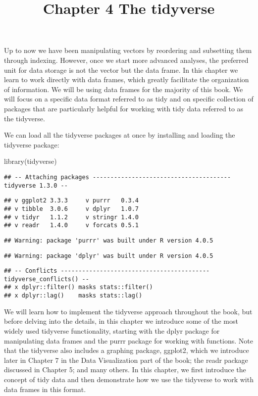 \documentclass[
]{article}
\title{Chapter 4 The tidyverse}
\author{}
\date{\vspace{-2.5em}}
\newenvironment{Shaded}{\begin{snugshade}}{\end{snugshade}}
\newcommand{\FunctionTok}[1]{\textcolor[rgb]{0.00,0.00,0.00}{#1}}
\newcommand{\NormalTok}[1]{#1}
\begin{document}
\maketitle

Up to now we have been manipulating vectors by reordering and subsetting
them through indexing. However, once we start more advanced analyses,
the preferred unit for data storage is not the vector but the data
frame. In this chapter we learn to work directly with data frames, which
greatly facilitate the organization of information. We will be using
data frames for the majority of this book. We will focus on a specific
data format referred to as tidy and on specific collection of packages
that are particularly helpful for working with tidy data referred to as
the tidyverse.

We can load all the tidyverse packages at once by installing and loading
the tidyverse package:

\begin{Shaded}
\begin{Highlighting}[]
\FunctionTok{library}\NormalTok{(tidyverse)}
\end{Highlighting}
\end{Shaded}

\begin{verbatim}
## -- Attaching packages --------------------------------------- tidyverse 1.3.0 --
\end{verbatim}

\begin{verbatim}
## v ggplot2 3.3.3     v purrr   0.3.4
## v tibble  3.0.6     v dplyr   1.0.7
## v tidyr   1.1.2     v stringr 1.4.0
## v readr   1.4.0     v forcats 0.5.1
\end{verbatim}

\begin{verbatim}
## Warning: package 'purrr' was built under R version 4.0.5
\end{verbatim}

\begin{verbatim}
## Warning: package 'dplyr' was built under R version 4.0.5
\end{verbatim}

\begin{verbatim}
## -- Conflicts ------------------------------------------ tidyverse_conflicts() --
## x dplyr::filter() masks stats::filter()
## x dplyr::lag()    masks stats::lag()
\end{verbatim}

We will learn how to implement the tidyverse approach throughout the
book, but before delving into the details, in this chapter we introduce
some of the most widely used tidyverse functionality, starting with the
dplyr package for manipulating data frames and the purrr package for
working with functions. Note that the tidyverse also includes a graphing
package, ggplot2, which we introduce later in Chapter 7 in the Data
Visualization part of the book; the readr package discussed in Chapter
5; and many others. In this chapter, we first introduce the concept of
tidy data and then demonstrate how we use the tidyverse to work with
data frames in this format.
\end{document}
